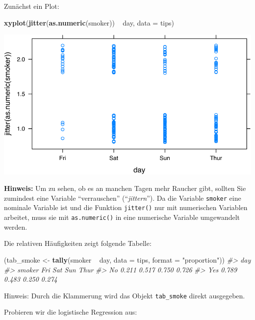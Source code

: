 \documentclass[12pt,]{book}
\newenvironment{Shaded}{\begin{snugshade}}{\end{snugshade}}
\newcommand{\KeywordTok}[1]{\textcolor[rgb]{0.13,0.29,0.53}{\textbf{{#1}}}}
\newcommand{\DataTypeTok}[1]{\textcolor[rgb]{0.13,0.29,0.53}{{#1}}}
\newcommand{\StringTok}[1]{\textcolor[rgb]{0.31,0.60,0.02}{{#1}}}
\newcommand{\CommentTok}[1]{\textcolor[rgb]{0.56,0.35,0.01}{\textit{{#1}}}}
\newcommand{\NormalTok}[1]{{#1}}
\begin{document}
Zunächst ein Plot:

\begin{Shaded}
\begin{Highlighting}[]
\KeywordTok{xyplot}\NormalTok{(}\KeywordTok{jitter}\NormalTok{(}\KeywordTok{as.numeric}\NormalTok{(smoker)) ~}\StringTok{ }\NormalTok{day, }\DataTypeTok{data =} \NormalTok{tips)}
\end{Highlighting}
\end{Shaded}

\begin{center}\includegraphics[width=0.7\linewidth]{072_klassifizierende_Regression_files/figure-latex/jitter_tips-1} \end{center}

\textbf{Hinweis:} Um zu sehen, ob es an manchen Tagen mehr Raucher gibt,
sollten Sie zumindest eine Variable ``verrauschen''
(``\emph{jittern}''). Da die Variable \texttt{smoker} eine nominale
Variable ist und die Funktion \texttt{jitter()} nur mit numerischen
Variablen arbeitet, muss sie mit \texttt{as.numeric()} in eine
numerische Variable umgewandelt werden.

Die relativen Häufigkeiten zeigt folgende Tabelle:

\begin{Shaded}
\begin{Highlighting}[]
\NormalTok{(tab_smoke <-}\StringTok{ }\KeywordTok{tally}\NormalTok{(smoker ~}\StringTok{ }\NormalTok{day, }\DataTypeTok{data =} \NormalTok{tips, }\DataTypeTok{format =} \StringTok{"proportion"}\NormalTok{))}
\CommentTok{#>       day}
\CommentTok{#> smoker   Fri   Sat   Sun  Thur}
\CommentTok{#>    No  0.211 0.517 0.750 0.726}
\CommentTok{#>    Yes 0.789 0.483 0.250 0.274}
\end{Highlighting}
\end{Shaded}

Hinweis: Durch die Klammerung wird das Objekt \texttt{tab\_smoke} direkt
ausgegeben.

Probieren wir die logistische Regression aus:
\end{document}

